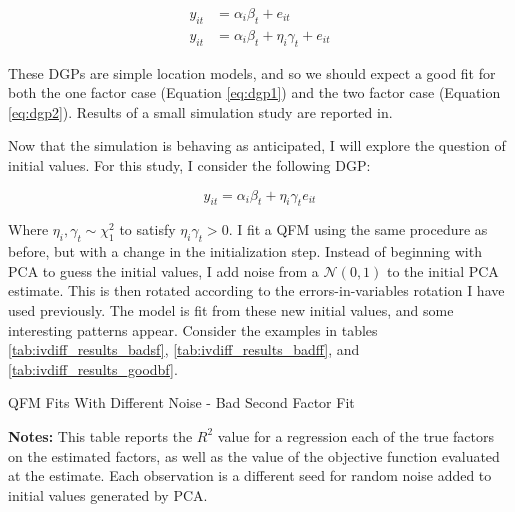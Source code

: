 \documentclass[12pt]{article}
\begin{document}
\begin{align}
    y_{it} &= \alpha_i\beta_t + e_{it} \label{eq:dgp1} \\ 
    y_{it} &= \alpha_i\beta_t + \eta_i\gamma_t + e_{it} \label{eq:dgp2}
\end{align}

\noindent These DGPs are simple location models, and so we should expect a good fit for both the one factor case (Equation \ref{eq:dgp1}) and the two factor case (Equation \ref{eq:dgp2}). Results of a small simulation study are reported in. 

\clearpage

Now that the simulation is behaving as anticipated, I will explore the question of initial values. For this study, I consider the following DGP:

\begin{equation}
    y_{it} = \alpha_i\beta_t + \eta_i\gamma_te_{it} \label{eq:dgp3}
\end{equation}

Where $\eta_i, \gamma_t \sim \chi^2_1$ to satisfy $\eta_i\gamma_t > 0$. I fit a QFM using the same procedure as before, but with a change in the initialization step. Instead of beginning with PCA to guess the initial values, I add noise from a $\mathcal{N}(0, 1)$ to the initial PCA estimate. This is then rotated according to the errors-in-variables rotation I have used previously. The model is fit from these new initial values, and some interesting patterns appear. Consider the examples in tables \ref{tab:ivdiff_results_badsf}, \ref{tab:ivdiff_results_badff}, and \ref{tab:ivdiff_results_goodbf}.

\begin{table}[ht]
    \begin{center}
        \caption{QFM Fits With Different Noise - Bad Second Factor Fit}
        \label{tab:ivdiff_results_badsf}
        \scalebox{0.8}{
            
        }
    \end{center}
    {\small \begin{singlespace} \textbf{Notes:} This table reports the $R^2$ value for a regression each of the true factors on the estimated factors, as well as the value of the objective function evaluated at the estimate. Each observation is a different seed for random noise added to initial values generated by PCA.\end{singlespace}}
\end{table}
\end{document}
